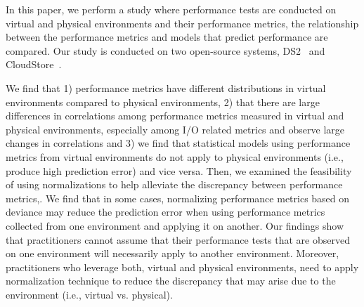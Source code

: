 


In this paper, we perform a study where performance tests are conducted on virtual and physical environments and their performance metrics, the relationship between the performance metrics and models that predict performance are compared. Our study is conducted on two open-source systems, DS2~\cite{delldvd} and CloudStore~\cite{cloudstore}. 


We find that 1) performance metrics have different distributions in virtual environments compared to physical environments, 2) that there are large differences in correlations among performance metrics measured in virtual and physical environments, especially among I/O related metrics  and observe large changes in correlations and 3) we find that statistical models using performance metrics from virtual environments do not apply to physical environments (i.e., produce high prediction error) and vice versa. Then, we examined the feasibility of using normalizations to help alleviate the discrepancy between performance metrics,. We find that in some cases, normalizing performance metrics based on deviance may reduce the prediction error when using performance metrics collected from one environment and applying it on another. Our findings show that practitioners cannot assume that their performance tests that are observed on one environment will necessarily apply to another environment. Moreover, practitioners who leverage both, virtual and physical environments, need to apply normalization technique to reduce the discrepancy that may arise due to the environment (i.e., virtual vs. physical). 

